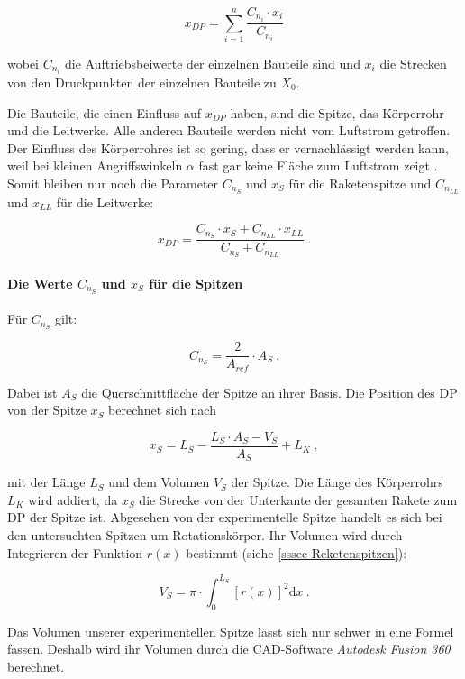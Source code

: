 \documentclass[10pt,a4paper]{article}
\begin{document}
\[ x_{DP} = \sum_{i=1}^{n} \frac{C_{n_{i}} \cdot x_{i}} {C_{n_{i}}}  \]

\noindent
wobei $C_{n_{i}}$ die Auftriebsbeiwerte der einzelnen Bauteile sind und $x_{i}$ die Strecken von den Druckpunkten der einzelnen Bauteile zu $X_{0}$.

Die Bauteile, die einen Einfluss auf $x_{DP}$ haben, sind die Spitze, das Körperrohr und die Leitwerke. Alle anderen Bauteile werden nicht vom Luftstrom getroffen. Der Einfluss des Körperrohres ist so gering, dass er vernachlässigt werden kann, weil bei kleinen Angriffswinkeln $\alpha$ fast gar keine Fläche zum Luftstrom zeigt \cite{AbR}. Somit bleiben nur noch die Parameter $C_{n_{S}}$ und $x_{S}$ für die Raketenspitze und $C_{n_{LL}}$ und $x_{LL}$ für die Leitwerke:

\begin{equation}
x_{DP} = \frac{C_{n_{S}} \cdot x_{S} + C_{n_{LL}} \cdot x_{LL}} {C_{n_{S}} + C_{n_{LL}}} \ .
\end{equation}

\paragraph{Die Werte $C_{n_{S}}$ und $x_{S}$ für die Spitzen} 
Für $C_{n_{S}}$ gilt:

\begin{equation}
C_{n_{S}} = \frac{2}{A_{ref}} \cdot A_{S} \ .
\label{equ-Cn_S}
\end{equation}

\noindent
Dabei ist $A_{S}$ die Querschnittfläche der Spitze an ihrer Basis. Die Position des DP von der Spitze $x_{S}$ berechnet sich nach

\begin{equation}
x_{S} = L_{S} - \frac{L_{S} \cdot A_{S} - V_{S}}{A_{S}} + L_{K} \ ,
\end{equation}

\noindent
mit der Länge $L_{S}$ und dem Volumen $V_{S}$ der Spitze. Die Länge des Körperrohrs $L_{K}$ wird addiert, da $x_{S}$ die Strecke von der Unterkante der gesamten Rakete zum DP der Spitze ist.
Abgesehen von der experimentelle Spitze handelt es sich bei den untersuchten Spitzen um Rotationskörper. Ihr Volumen wird durch Integrieren der Funktion $r(x)$ bestimmt (siehe \ref{sssec-Reketenspitzen}):

\[ V_{S} = \pi \cdot \int_{0}^{L_{S}}[r(x)]^{2} \mathrm{d}x \ .\]

\noindent
Das Volumen unserer experimentellen Spitze lässt sich nur schwer in eine Formel fassen. Deshalb wird ihr Volumen durch die CAD-Software \emph{Autodesk Fusion 360\texttrademark} berechnet.
\end{document}
